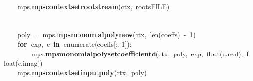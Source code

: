 \documentclass{article}\usepackage[]{graphicx}\usepackage[dvipsnames,table]{xcolor}
\makeatletter
\newcommand{\hlnum}[1]{\textcolor[rgb]{0.686,0.059,0.569}{#1}}%
\newcommand{\hlopt}[1]{\textcolor[rgb]{0,0,0}{#1}}%
\newcommand{\hldef}[1]{\textcolor[rgb]{0.345,0.345,0.345}{#1}}%
\newcommand{\hlkwa}[1]{\textcolor[rgb]{0.161,0.373,0.58}{\textbf{#1}}}%
\newcommand{\hlkwb}[1]{\textcolor[rgb]{0.69,0.353,0.396}{#1}}%
\newcommand{\hlkwd}[1]{\textcolor[rgb]{0.737,0.353,0.396}{\textbf{#1}}}%
\newenvironment{kframe}{%
 \def\at@end@of@kframe{}%
 \ifinner\ifhmode%
  \def\at@end@of@kframe{\end{minipage}}%
  \begin{minipage}{\columnwidth}%
 \fi\fi%
 \def\FrameCommand##1{\hskip\@totalleftmargin \hskip-\fboxsep
 \colorbox{shadecolor}{##1}\hskip-\fboxsep
     \hskip-\linewidth \hskip-\@totalleftmargin \hskip\columnwidth}%
 \MakeFramed {\advance\hsize-\width
   \@totalleftmargin\z@ \linewidth\hsize
   \@setminipage}}%
 {\par\unskip\endMakeFramed%
 \at@end@of@kframe}
\newenvironment{knitrout}{}{} %
\makeatother
\begin{document}
\begin{center}
\begin{minipage}[m]{18cm}
\begin{knitrout}
\begin{kframe}
\hldef{}\hldef{\ \ \ \ }\hldef{}\hspace*{\fill}\\
\hldef{}\hldef{\ \ \ \ }\hldef{\textunderscore mps}\hlopt{.}\hldef{}\hlkwd{mps\textunderscore context\textunderscore set\textunderscore root\textunderscore stream}\hldef{}\hlopt{(}\hldef{ctx}\hlopt{,\ }\hldef{roots\textunderscore FILE}\hlopt{)}\hspace*{\fill}\\
\hldef{}\hspace*{\fill}\\
\hldef{}\hldef{\ \ \ \ }\hldef{}\hspace*{\fill}\\
\hldef{}\hldef{\ \ \ \ }\hldef{poly\ }\hlopt{=\ }\hldef{\textunderscore mps}\hlopt{.}\hldef{}\hlkwd{mps\textunderscore monomial\textunderscore poly\textunderscore new}\hldef{}\hlopt{(}\hldef{ctx}\hlopt{,\ }\hldef{}\hlkwb{len}\hldef{}\hlopt{(}\hldef{coeffs}\hlopt{)\ {-}\ }\hldef{}\hlnum{1}\hldef{}\hlopt{)}\hspace*{\fill}\\
\hldef{}\hldef{\ \ \ \ }\hldef{}\hlkwa{for\ }\hldef{exp}\hlopt{,\ }\hldef{c\ }\hlkwa{in\ }\hldef{}\hlkwb{enumerate}\hldef{}\hlopt{(}\hldef{coeffs}\hlopt{{[}::{-}}\hldef{}\hlnum{1}\hldef{}\hlopt{{]}):}\hspace*{\fill}\\
\hldef{}\hldef{\ \ \ \ \ \ \ \ }\hldef{\textunderscore mps}\hlopt{.}\hldef{}\hlkwd{mps\textunderscore monomial\textunderscore poly\textunderscore set\textunderscore coefficient\textunderscore d}\hldef{}\hlopt{(}\hldef{ctx}\hlopt{,\ }\hldef{poly}\hlopt{,\ }\hldef{exp}\hlopt{,\ }\hldef{}\hlkwb{float}\hldef{}\hlopt{(}\hldef{c}\hlopt{.}\hldef{real}\hlopt{),\ }\hldef{}\hlkwb{float}\hldef{}\hlopt{(}\hldef{c}\hlopt{.}\hldef{imag}\hlopt{))}\hspace*{\fill}\\
\hldef{}\hldef{\ \ \ \ }\hldef{\textunderscore mps}\hlopt{.}\hldef{}\hlkwd{mps\textunderscore context\textunderscore set\textunderscore input\textunderscore poly}\hldef{}\hlopt{(}\hldef{ctx}\hlopt{,\ }\hldef{poly}\hlopt{)}\hspace*{\fill}\\
\hldef{}\hspace*{\fill}\\
\hldef{}\hldef{\ \ \ \ }\hldef{}\hspace*{\fill}\\

\end{kframe}
\end{knitrout}
\end{minipage}
\end{center}
\end{document}
